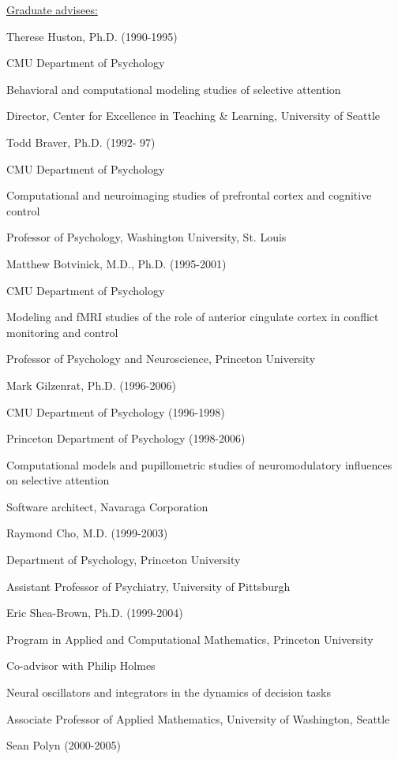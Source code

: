 \documentclass[10 pt]{article}
\begin{document}
{\fontsize{12pt}{16 pt}\selectfont \underline{Graduate advisees:}}
    \smallskip

Therese Huston, Ph.D. (1990-1995)

CMU Department of Psychology

Behavioral and computational modeling studies of selective attention

Director, Center for Excellence in Teaching \& Learning, University of Seattle
    \medskip

Todd Braver, Ph.D. (1992- 97)

CMU Department of Psychology

Computational and neuroimaging studies of prefrontal cortex and cognitive control

Professor of Psychology, Washington University, St. Louis
    \medskip

Matthew Botvinick, M.D., Ph.D. (1995-2001)

CMU Department of Psychology

Modeling and fMRI studies of the role of anterior cingulate cortex in conflict monitoring and control

Professor of Psychology and Neuroscience, Princeton University
    \medskip

Mark Gilzenrat, Ph.D. (1996-2006)

CMU Department of Psychology (1996-1998)

Princeton Department of Psychology (1998-2006)

Computational models and pupillometric studies of neuromodulatory influences on selective attention

Software architect, Navaraga Corporation
    \medskip

Raymond Cho, M.D. (1999-2003)

Department of Psychology, Princeton University

Assistant Professor of Psychiatry, University of Pittsburgh
    \medskip

Eric Shea-Brown, Ph.D. (1999-2004)

Program in Applied and Computational Mathematics, Princeton University

Co-advisor with Philip Holmes

Neural oscillators and integrators in the dynamics of decision tasks

Associate Professor of Applied Mathematics, University of Washington, Seattle
    \medskip

Sean Polyn (2000-2005)
\end{document}
